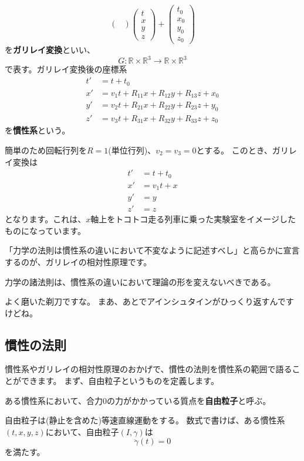 \begin{definition}[ガリレイ変換と慣性系]
\[\begin{pmatrix}
    \end{pmatrix}
    \begin{pmatrix}
      t\\x\\y\\z
    \end{pmatrix}
    +
    \begin{pmatrix}
      t_0\\x_0\\y_0\\z_0
    \end{pmatrix}
  \]
  を\textbf{ガリレイ変換}といい、
  \[
    G:\mathbb{R}\times\mathbb{R}^3\to\mathbb{R}\times\mathbb{R}^3
  \]
  で表す。ガリレイ変換後の座標系
  \begin{align*}
    t'&=t+t_0\\
    x'&=v_1t+R_{11}x+R_{12}y+R_{13}z+x_0\\
    y'&=v_2t+R_{21}x+R_{22}y+R_{23}z+y_0\\
    z'&=v_3t+R_{31}x+R_{32}y+R_{33}z+z_0
  \end{align*}
  を\textbf{慣性系}という。
\end{definition}

\begin{example}
  簡単のため回転行列を$R=1$(単位行列)、$v_2=v_3=0$とする。
  このとき、ガリレイ変換は
  \begin{align*}
    t'&=t+t_0\\
    x'&=v_1t+x\\
    y'&=y\\
    z'&=z
  \end{align*}
  となります。これは、$x$軸上をトコトコ走る列車に乗った実験室をイメージしたものになっています。
\end{example}

「力学の法則は慣性系の違いにおいて不変なように記述すべし」と高らかに宣言するのが、ガリレイの相対性原理です。
\begin{definition}[ガリレイの相対性原理]
  力学の諸法則は、慣性系の違いにおいて理論の形を変えないべきである。
\end{definition}
よく磨いた剃刀ですな。
まあ、あとでアインシュタインがひっくり返すんですけどね。

\subsection{慣性の法則}

慣性系やガリレイの相対性原理のおかげで、慣性の法則を慣性系の範囲で語ることができます。
まず、自由粒子というものを定義します。
\begin{definition}
  ある慣性系において、合力0の力がかかっている質点を\textbf{自由粒子}と呼ぶ。
\end{definition}
\begin{definition}[慣性の法則]
  自由粒子は(静止を含めた)等速直線運動をする。
  数式で書けば、ある慣性系$(t,x,y,z)$において、自由粒子$(I,\gamma)$は
  \[
    \ddot\gamma(t)=0
  \]
  を満たす。
\end{definition}


